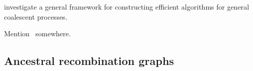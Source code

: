 \documentclass{article}
\newcommand{\IN}{\ensuremath{\mathds{N}}}%
\newcommand{\one}[1]{\ensuremath{\mathds{1}_{\left\{ #1 \right\}}}}%
\begin{document}
\cite{becheler2020occupancy}  investigate a general framework for  constructing efficient algorithms for general  coalescent processes.


\begin{comment}%
A coalescent process is a continuous-time Markov process taking values among the
partitions of $\IN := \{1,2, \ldots \}$, such that the restriction to
any finite $n \in \IN $ takes values among partitions of
$[n] := \{1, 2, \ldots, n\}$.  Write $\one{A} = 1$ if $A$ holds, and zero otherwise.   Let $\cP_n$ denote the set of
partitions of $[n]$.  In the classical Kingman-coalescent, the only
possible transitions are the mergers of pairs of blocks (elements of a
partition $\pi \in \cP_n$), one pair at a time.  The $n$ leaves
(corresponding to the sampled DNA sequences) are arbitrarily labelled
from 1 to $n$, and  the blocks of a partition represent the common ancestors
of the labels of each block.    The initial state is  (usually) taken as
$\{ \{1\}, \ldots, \{n\}\}$, and the final state, i.e.\ when the most
recent common ancester is reached, as $\{ [n]\}$. A block in a partition of
$[n]$ represents an ancestor of the leaves in the block, i.e.\ the block
$\{i_1, \ldots, i_k\}$ in a given partition of $[n]$ is an ancestor of the
$k$ leaves $i_1, \ldots, i_k \in [n]$, and the leaves  correspond to
arbitrarily labelled DNA sequences in the sample.
\end{comment}



Mention~\citep{becheler2020occupancy} somewhere.

\subsection*{Ancestral recombination graphs}
\end{document}
